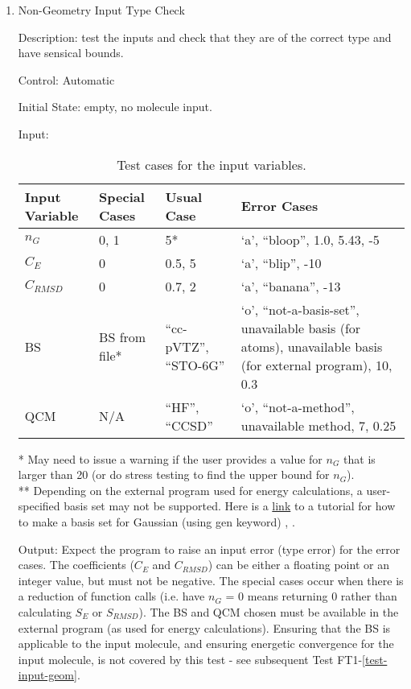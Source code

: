 \documentclass[12pt, titlepage]{article}
\begin{document}
\begin{enumerate}

\item Non-Geometry Input Type Check

Description: test the inputs and check that they are of the correct type and 
have sensical bounds.

Control: Automatic

Initial State: empty, no molecule input.

Input:
\begin{table}[H]
	\begin{tabular}{p{3cm}p{3cm}p{2.5cm}p{4cm}}
		\toprule
		Input Variable & Special Cases & Usual Case & Error Cases \\
		\midrule
		$n_G$    & 0, 1        & 5*          & `a', ``bloop'', 1.0, 5.43, -5 \\
		$C_E$    & 0          & 0.5, 5        & `a', ``blip'', -10 \\
		$C_{RMSD}$ & 0        & 0.7, 2       & `a', ``banana'', -13 \\
		BS       & BS from file*  & ``cc-pVTZ'', ``STO-6G'' & 
		`o', ``not-a-basis-set'', unavailable basis (for atoms), unavailable 
		basis (for external program), 10, 0.3 \\
		QCM      & N/A           & ``HF'', ``CCSD'' & `o', ``not-a-method'', 
		unavailable method, 7, 
		0.25 
		\\
		\bottomrule
	\end{tabular}
\label{table-inputs}
\caption{Test cases for the input variables.}
\end{table}

* May need to issue a warning if the user provides a value for $n_G$ that is 
larger than 20 (or do stress testing to find the upper bound for $n_G$).\\
** Depending on the external program used for energy calculations, a 
user-specified basis set may not be supported. Here is a 
\href{https://joaquinbarroso.com/2011/11/02/gen-keyword-gaussian/}{link} to a 
tutorial for how to make a basis set for Gaussian (using gen keyword) 
\cite{link-gen-basis}, \cite{g16}.

Output: Expect the program to raise an input error (type error) for the error 
cases. The coefficients ($C_E$ and $C_{RMSD}$) can be either a floating point 
or an integer value, but must not be negative. The special cases occur when 
there is a reduction of function calls (i.e. have $n_G$ = 0 means returning 0 
rather than calculating $S_E$ or $S_{RMSD}$). The BS and QCM chosen must be 
available in the external program (as used for energy calculations). Ensuring 
that the BS is applicable to the input molecule, and ensuring energetic 
convergence for the input molecule, is not covered by this test - see 
subsequent Test FT1-\ref{test-input-geom}.


\end{enumerate}
\end{document}
